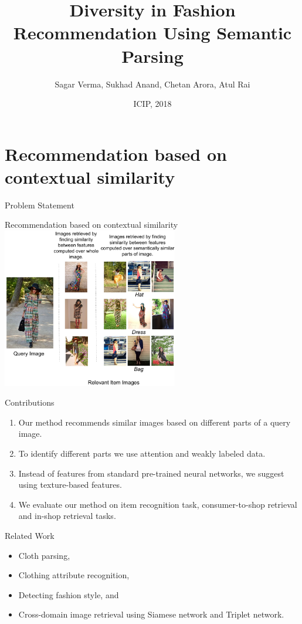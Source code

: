 \documentclass[handout]{beamer}
\title[EVA, Ann Arbor, MI 2015 \insertdate]{Diversity in Fashion Recommendation Using Semantic Parsing}
\author{Sagar Verma\inst{1}, Sukhad Anand\inst{1}, Chetan Arora\inst{1}, Atul Rai\inst{2}}
\institute[IIIT Delhi and Staqu Technologies] %
{
  \inst{1}%
  Department of Computer Science and Engineering\\
  Indraprastha Institute of Information Technology, Delhi.
  \and
  \inst{2}%
  Staqu Technologies}
\date{ICIP, 2018}
\begin{document}
\begin{frame}
\titlepage
\end{frame}

\section{Recommendation based on contextual similarity}

\begin{frame}{Problem Statement}
\begin{center}
{\Large Recommendation based on contextual similarity}\\
\vspace{.5cm}
\includegraphics[width=0.8\linewidth, height=7cm]{images/teaser_staqu_texture}
\end{center}
\end{frame}


\begin{frame}{Contributions}
  \begin{enumerate}
    \item Our method recommends similar images based on different parts of a query image.

    \item To identify different parts we use attention and weakly labeled data.

    \item Instead of features from standard pre-trained neural networks, we suggest using texture-based features.

    \item We evaluate our method on item recognition task, consumer-to-shop retrieval and in-shop retrieval tasks.
  \end{enumerate}
\end{frame}

\begin{frame}{Related Work}
  \begin{itemize}
    \item Cloth parsing,
    \item Clothing attribute recognition,
    \item Detecting fashion style, and
    \item Cross-domain image retrieval using Siamese network and Triplet network.
  \end{itemize}
\end{frame}
\end{document}
